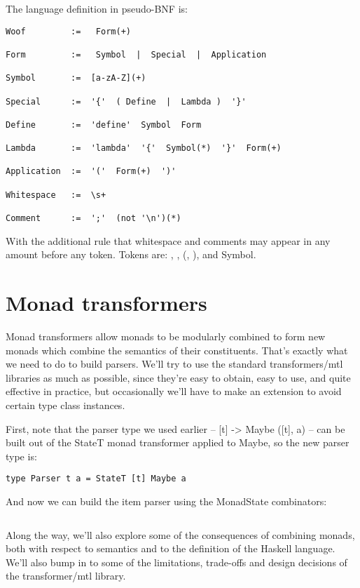 \documentclass{tmr}
\begin{document}
The language definition in pseudo-BNF is:

\begin{verbatim}
Woof         :=   Form(+)

Form         :=   Symbol  |  Special  |  Application

Symbol       :=  [a-zA-Z](+)

Special      :=  '{'  ( Define  |  Lambda )  '}'

Define       :=  'define'  Symbol  Form

Lambda       :=  'lambda'  '{'  Symbol(*)  '}'  Form(+)

Application  :=  '('  Form(+)  ')'

Whitespace   :=  \s+

Comment      :=  ';'  (not '\n')(*)
\end{verbatim}
With the additional rule that whitespace and comments may appear in any 
amount before any token.  Tokens are:  {, }, (, ), and Symbol.



\section{Monad transformers}
Monad transformers allow monads to be modularly combined to form new monads
which combine the semantics of their constituents.  That's exactly what we need
to do to build parsers.
We'll try to use the standard transformers/mtl libraries as much as possible, 
since they're easy to obtain, easy to use, and quite effective in practice, but
occasionally we'll have to make an extension to avoid certain type class
instances.

First, note that the parser type we used earlier -- [t] -> Maybe ([t], a) -- 
can be built out of the StateT monad transformer applied to Maybe, so the new
parser type is:
\begin{verbatim}
type Parser t a = StateT [t] Maybe a
\end{verbatim}
And now we can build the item parser using the MonadState combinators:
\begin{verbatim}

\end{verbatim}


Along the way, we'll also explore some of the consequences of combining monads,
both with respect to semantics and to the definition of the Haskell language.  We'll
also bump in to some of the limitations, trade-offs and design decisions of the 
transformer/mtl library.
\end{document}
